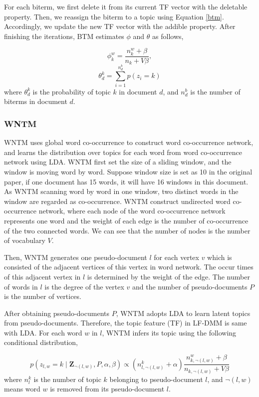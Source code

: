 \documentclass[10pt,journal,compsoc]{IEEEtran}
\begin{document}
{ For each biterm, we first delete it from its current TF vector with the deletable property. Then, we reassign the biterm to a topic using Equation \ref{btm}. Accordingly, we update the new TF vector with the addible property. After finishing the iterations, BTM estimates $\phi$ and $\theta$ as follows,

\begin{equation}
\phi_k^w=\frac{n_k^w+\beta}{n_k+V\beta},
\end{equation}
\begin{equation}
\theta_d^k=\sum_{i=1}^{n_d^b}p(z_i=k)
\end{equation}
where $\theta_d^k$ is the probability of topic $k$ in document $d$, and $n_d^b$ is the number of biterms in document $d$.

\subsubsection{WNTM}

WNTM \cite{zuo2016word} uses global word co-occurrence to construct word co-occurrence network, and learns the distribution over topics for each word from word co-occurrence network using LDA. WNTM first set the size of a sliding window, and the window is moving word by word. Suppose window size is set as 10 in the original paper, if one document has 15 words, it will have 16 windows in this document. As WNTM scanning word by word in one window, two distinct words in the window are regarded as co-occurrence. WNTM construct undirected word co-occurrence network, where each node of the word co-occurrence network represents one word and the weight of each edge is the number of co-occurrence of the two connected words. We can see that the number of nodes is the number of vocabulary $V$. 

 Then, WNTM generates one pseudo-document $l$ for each vertex $v$ which is consisted of the adjacent vertices of this vertex in word network. The occur times of this adjacent vertex in $l$ is determined by the weight of the edge. The number of words in $l$ is the degree of the vertex $v$ and the number of pseudo-documents $P$ is the number of vertices.

After obtaining pseudo-documents $P$, WNTM adopts LDA to learn latent topics from pseudo-documents. Therefore, the topic feature (TF) in LF-DMM is same with LDA. For each word $w$ in $l$, WNTM infers its topic using the following conditional distribution,

\begin{equation} 
p(z_{l,w}=k \mid \bm{Z}_{\neg{(l,w)}}, P, \alpha, \beta) \propto (n_{l,\neg{(l,w)}}^{k} + \alpha)\dfrac{ n^{w}_{k,\neg{(l,w)}}+\beta}{n_{k,\neg{(l,w)}}+V\beta} 
\end{equation}
where $n_l^k$ is the number of topic $k$ belonging to pseudo-document $l$, and $\neg{(l,w)}$ means word $w$ is removed from its pseudo-document $l$.

}
\end{document}
